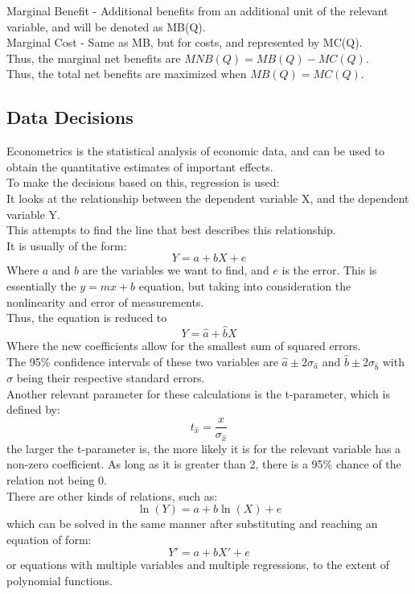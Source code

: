 \documentclass[nobib]{article}
\begin{document}
Marginal Benefit - Additional benefits from an additional unit of the relevant
variable, and will be denoted as MB(Q).\\ Marginal Cost - Same as MB, but for
costs, and represented by MC(Q).\\ Thus, the marginal net benefits are $MNB(Q)
    = MB(Q)-MC(Q)$.\\ Thus, the total net benefits are maximized when
$MB(Q)=MC(Q)$.\\
\subsection{Data Decisions}
Econometrics is the statistical analysis of economic data, and can be used to
obtain the quantitative estimates of important effects.\\ To make the decisions
based on this, regression is used:\\ It looks at the relationship between the
dependent variable X, and the dependent variable Y.\\ This attempts to find the
line that best describes this relationship.\\ It is usually of the form:
\begin{equation*}
    Y = a + bX + e
\end{equation*}
Where $a$ and $b$ are the variables we want to find, and $e$ is the error.
This is essentially the $y=mx+b$ equation, but taking into consideration the nonlinearity and error of measurements.\\
Thus, the equation is reduced to
\begin{equation*}
    Y = \hat{a} + \hat{b}X
\end{equation*}
Where the new coefficients allow for the smallest sum of squared errors.\\
The 95\% confidence intervals of these two variables are $\hat{a}\pm 2\sigma_{\hat{a}}$ and $\hat{b}\pm 2\sigma_{\hat{b}}$ with $\sigma$ being their respective standard errors.\\
Another relevant parameter for these calculations is the t-parameter, which is defined by:
\begin{equation*}
    t_{\hat{x}} = \frac{x}{\sigma_{\hat{x}}}
\end{equation*}
the larger the t-parameter is, the more likely it is for the relevant variable has a non-zero coefficient. As long as it is greater than 2, there is a 95\% chance of the relation not being 0.\\
There are other kinds of relations, such as:
\begin{equation*}
    \ln(Y) = a+b\ln(X)+e
\end{equation*}
which can be solved in the same manner after substituting and reaching an equation of form:
\begin{equation*}
    Y' = a +bX'+e
\end{equation*}
or equations with multiple variables and multiple regressions, to the extent of polynomial functions.\\~\\
\end{document}
